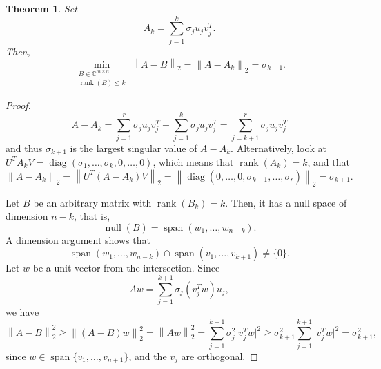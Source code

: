 \documentclass{article}
\newcommand{\norm}[1]{\left \lVert #1 \right \rVert}
\newcommand{\abs}[1]{\lvert #1 \rvert}
\newtheorem{theorem}{Theorem}[section]
\begin{document}
\begin{theorem}
Set
\begin{equation*}
A_{k} = \sum_{j=1}^{k} \sigma_{j} u_{j} v_{j}^{T}.
\end{equation*}
Then,
\begin{equation*}
\min_{\substack{B \in \mathbb{C}^{m \times n} \\
\operatorname{rank}(B) \leq k}} \norm{A-B}_{2} = \norm{A-A_{k}}_{2}
= \sigma_{k+1}.
\end{equation*}
\end{theorem}
\begin{proof}
\begin{equation*}
A-A_{k} = \sum_{j=1}^{r} \sigma_{j} u_{j} v_{j}^{T} - \sum_{j=1}^{k}
\sigma_{j} u_{j} v_{j}^{T} = \sum_{j=k+1}^{r} \sigma_{j} u_{j}
v_{j}^{T}
\end{equation*}
and thus $\sigma_{k+1}$ is the largest singular value of $A-A_{k}$.
Alternatively, look at $U^{T} A_{k} V =
\operatorname{diag}(\sigma_{1},\ldots,\sigma_{k},0,\ldots,0)$, which
means that $\operatorname{rank}(A_{k}) = k$, and that
\begin{equation*}
\norm{A-A_{k}}_{2} = \norm{U^{T} (A-A_{k}) V}_{2} =
\norm{\operatorname{diag}(0,\ldots,0,\sigma_{k+1},\ldots,\sigma_{r})}_{2}
= \sigma_{k+1}.
\end{equation*}

Let $B$ be an arbitrary matrix with $\operatorname{rank}(B_{k}) =
k$. Then, it has a null space of dimension $n-k$, that is,
\begin{equation*}
\operatorname{null}(B) = \operatorname{span}(w_{1},\ldots,w_{n-k}).
\end{equation*}
A dimension argument shows that
\begin{equation*}
\operatorname{span}(w_{1},\ldots,w_{n-k}) \cap
\operatorname{span}(v_{1},\ldots,v_{k+1}) \ne \{ 0 \}.
\end{equation*}
Let $w$ be a unit vector from the intersection. Since
\begin{equation*}
Aw = \sum_{j=1}^{k+1} \sigma_{j} (v_{j}^{T}w) u_{j},
\end{equation*}
we have
\begin{equation*}
\norm{A-B}_{2}^{2} \ge \norm{(A-B)w}_{2}^{2} = \norm{Aw}_{2}^{2} =
\sum_{j=1}^{k+1} \sigma_{j}^{2} \abs{v_{j}^{T}w}^{2} \ge
\sigma_{k+1}^{2} \sum_{j=1}^{k+1} \abs{v_{j}^{T}w}^{2} =
\sigma_{k+1}^{2},
\end{equation*}
since $w \in \operatorname{span}\{v_{1},\ldots,v_{n+1}\}$, and the
$v_{j}$ are orthogonal.
\end{proof}
\end{document}
